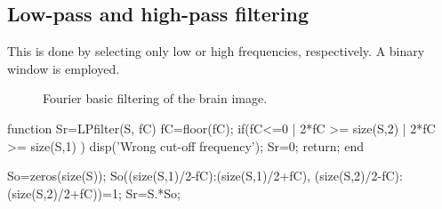 \subsection{Low-pass and high-pass filtering}
This is done by selecting only low or high frequencies, respectively. A binary window is employed.
\begin{figure}[htbp]
 \centering
 \hspace{1cm}
 
 \caption{Fourier basic filtering of the brain image.}
 \label{fig:fourier:matlab:filters}
\end{figure}

\begin{matlab}
function Sr=LPfilter(S, fC)
fC=floor(fC);
if(fC<=0 | 2*fC >= size(S,2) | 2*fC >= size(S,1) )
   disp('Wrong cut-off frequency');
   Sr=0;
   return;
end

So=zeros(size(S));
So((size(S,1)/2-fC):(size(S,1)/2+fC), (size(S,2)/2-fC):(size(S,2)/2+fC))=1;
Sr=S.*So;
\end{matlab}

